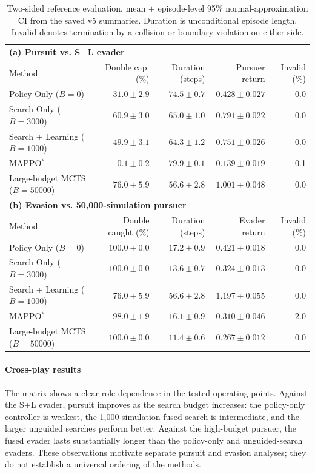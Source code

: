 \documentclass[letterpaper,10pt,conference]{ieeeconf}
\begin{document}
\begin{table}[t]
\centering\footnotesize
\caption{Two-sided reference evaluation, mean $\pm$ episode-level
95\% normal-approximation CI from the saved v5 summaries. Duration is
unconditional episode length. Invalid denotes termination by a
collision or boundary violation on either side.}
\label{tab:twosided}
\begin{tabular*}{\textwidth}{@{\extracolsep{\fill}}lrrrr@{}}\toprule
\multicolumn{5}{l}{\textbf{(a) Pursuit vs. S+L evader}}\\
Method & Double cap. (\%) & Duration (steps) & Pursuer return & Invalid (\%) \\ \midrule
Policy Only ($B=0$) & $31.0\pm2.9$ & $74.5\pm0.7$ & $0.428\pm0.027$ & 0.0 \\
Search Only ($B=3000$) & $60.9\pm3.0$ & $65.0\pm1.0$ & $0.791\pm0.022$ & 0.0 \\
Search + Learning ($B=1000$) & $49.9\pm3.1$ & $64.3\pm1.2$ & $0.751\pm0.026$ & 0.0 \\
MAPPO$^*$ & $0.1\pm0.2$ & $79.9\pm0.1$ & $0.139\pm0.019$ & 0.1 \\
Large-budget MCTS ($B=50000$) & $76.0\pm5.9$ & $56.6\pm2.8$ & $1.001\pm0.048$ & 0.0 \\
\midrule
\multicolumn{5}{l}{\textbf{(b) Evasion vs. 50,000-simulation pursuer}}\\
Method & Double caught (\%) & Duration (steps) & Evader return & Invalid (\%) \\ \midrule
Policy Only ($B=0$) & $100.0\pm0.0$ & $17.2\pm0.9$ & $0.421\pm0.018$ & 0.0 \\
Search Only ($B=3000$) & $100.0\pm0.0$ & $13.6\pm0.7$ & $0.324\pm0.013$ & 0.0 \\
Search + Learning ($B=1000$) & $76.0\pm5.9$ & $56.6\pm2.8$ & $1.197\pm0.055$ & 0.0 \\
MAPPO$^*$ & $98.0\pm1.9$ & $16.1\pm0.9$ & $0.310\pm0.046$ & 2.0 \\
Large-budget MCTS ($B=50000$) & $100.0\pm0.0$ & $11.4\pm0.6$ & $0.267\pm0.012$ & 0.0 \\
\bottomrule\end{tabular*}
\end{table}

\paragraph*{Cross-play results}
The matrix shows a clear role dependence in the tested operating points.
Against the S+L evader, pursuit improves as the search budget increases:
the policy-only controller is weakest, the 1,000-simulation fused search
is intermediate, and the larger unguided searches perform better. Against
the high-budget pursuer, the fused evader lasts substantially longer than
the policy-only and unguided-search evaders. These observations motivate
separate pursuit and evasion analyses; they do not establish a universal
ordering of the methods.
\end{document}

